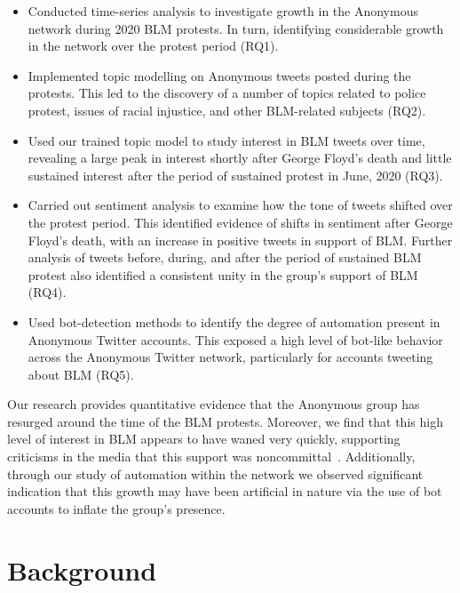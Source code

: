 \documentclass[letterpaper]{article}
\begin{document}
\begin{itemize}
\item Conducted time-series analysis to investigate growth in the Anonymous network during 2020 BLM protests. In turn, identifying considerable growth in the network over the protest period (RQ1).

\item Implemented topic modelling on Anonymous tweets posted during the protests. This led to the discovery of a number of topics related to police protest, issues of racial injustice, and other BLM-related subjects (RQ2).

\item Used our trained topic model to study interest in BLM tweets over time, revealing a large peak in interest shortly after George Floyd's death and little sustained interest after the period of sustained protest in June, 2020 (RQ3).

\item Carried out sentiment analysis to examine how the tone of tweets shifted over the protest period. This identified evidence of shifts in sentiment after George Floyd's death, with an increase in positive tweets in support of BLM. Further analysis of tweets before, during, and after the period of sustained BLM protest also identified a consistent unity in the group's support of BLM (RQ4).

\item Used bot-detection methods to identify the degree of automation present in Anonymous Twitter accounts. This exposed a high level of bot-like behavior across the Anonymous Twitter network, particularly for accounts tweeting about BLM (RQ5).
\end{itemize}

Our research provides quantitative evidence that the Anonymous group has resurged around the time of the BLM protests. Moreover, we find that this high level of interest in BLM appears to have waned very quickly, supporting criticisms in the media that this support was noncommittal~\cite{Telegraph2020}. Additionally, through our study of automation within the network we observed significant indication that this growth may have been artificial in nature via the use of bot accounts to inflate the group's presence.

\section{Background}
\label{Background}
\end{document}
